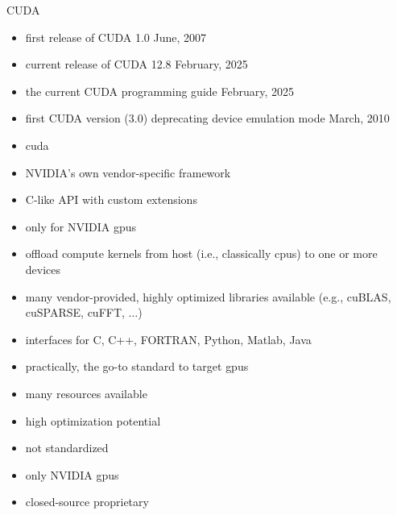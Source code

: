 \newpage

CUDA
\begin{itemize}
    \item first release of CUDA 1.0 June, 2007~\cite{nvidia_corporation_cuda_2007}
    \item current release of CUDA 12.8 February, 2025~\cite{nvidia_corporation_cuda_2025-1}
    \item the current CUDA programming guide February, 2025~\cite{nvidia_corporation_cuda_2025}
    \item first CUDA version (3.0) deprecating device emulation mode March, 2010~\cite{nvidia_corporation_cuda_2010}
\end{itemize}

\begin{itemize}
    \item \acrfull{cuda}
    \item NVIDIA's own vendor-specific framework
    \item C-like API with custom extensions 
    \item only for NVIDIA \glspl{gpu}
    \item offload compute kernels from host (i.e., classically \glspl{cpu}) to one or more devices
    \item many vendor-provided, highly optimized libraries available (e.g., cuBLAS, cuSPARSE, cuFFT, $\dots$)
    \item interfaces for C, C++, FORTRAN, Python, Matlab, Java
\end{itemize}

\begin{advantagebox}
    \begin{itemize}
        \item practically, the go-to standard to target \glspl{gpu}
        \item many resources available
        \item high optimization potential
    \end{itemize}
\end{advantagebox}

\begin{disadvantagebox}
    \begin{itemize}
        \item not standardized
        \item only NVIDIA \glspl{gpu}
        \item closed-source proprietary
    \end{itemize}
\end{disadvantagebox}




